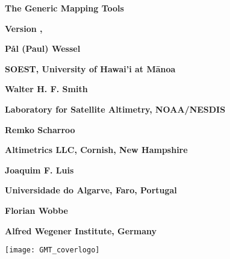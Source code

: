 %
%

\thispagestyle{empty}

\begin{center}
\Huge
\textbf{The Generic Mapping Tools}\par 
\vspace{0.5\baselineskip}
\textbf{\GMTTITLE}\par 

\large
\vspace{0.5\baselineskip}
\textbf{Version \GMTDOCVERSION, \GMTDOCDATE}\par 
\vspace{0.25\baselineskip}

\vspace{2.0\baselineskip}

\huge
\textbf{P\aa l (Paul) Wessel}\par 
\vspace{0.5\baselineskip}

\Large
\textbf{SOEST, University of Hawai'i at M\={a}noa}\par 
\vspace{0.3\baselineskip}

\huge
\textbf{Walter H. F. Smith}\par 
\vspace{0.3\baselineskip}

\Large
\textbf{Laboratory for Satellite Altimetry, NOAA/NESDIS}\par 
\vspace{0.3\baselineskip}

\huge
\textbf{Remko Scharroo}\par 
\vspace{0.3\baselineskip}

\Large
\textbf{Altimetrics LLC, Cornish, New Hampshire}\par 
\vspace{0.3\baselineskip}

\huge
\textbf{Joaquim F. Luis}\par 
\vspace{0.3\baselineskip}

\Large
\textbf{Universidade do Algarve, Faro, Portugal}\par 
\vspace{0.3\baselineskip}

\huge
\textbf{Florian Wobbe}\par 
\vspace{0.3\baselineskip}

\Large
\textbf{Alfred Wegener Institute, Germany}\par 
\vspace{0.3\baselineskip}

\texttt{[image: GMT\_coverlogo]}
\end{center}
